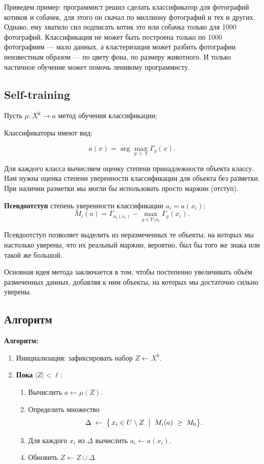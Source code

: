 Приведем пример: программист решил сделать классификатор для фотографий котиков и собачек, для этого он скачал по миллиону фотографий и тех и других. Однако, ему хватило сил подписать котик это или собачка только для 1000 фотографий. Классификация не может быть построена только по 1000 фотографиям --- мало данных, а кластеризация может разбить фотографии неизвестным образом --- по цвету фона, по размеру животного. И только частичное обучение может помочь ленивому программисту.
\subsection{Self-training}


Пусть $\mu: X^{\text{k}} \to a$ \textendash{} метод обучения классификации;

Классификаторы имеют вид:

\[
    a(x) = \arg \max_{y \: \in \: Y}{\Gamma_{y}(x)}.
\]

Для каждого класса вычисляем оценку степени принадлежности объекта классу. Нам нужна оценка степени уверенности классификации для объекта без разметки. При наличии разметки мы могли бы использовать просто маржин (отступ).

\textbf{Псевдоотступ} \textendash{} степень уверенности классификации $a_i = a(x_i):$
\[
    M_i(a) = \Gamma_{a_i(x_i)} - \max_{y \in Y \setminus a_i}{\Gamma_y(x_i)}.
\]

Псевдоотступ позволяет выделить из неразмеченных те объекты, на которых мы настолько уверены, что их реальный маржин, вероятно, был бы того же знака или такой же большой.

Основная идея метода заключается в том, чтобы постепенно увеличивать объём размеченных данных, добавляя к ним объекты, на которых мы достаточно сильно уверены.

\subsection*{Алгоритм}

\noindent
\textbf{Алгоритм:}
\begin{enumerate}
    \item Инициализация: зафиксировать набор $Z \gets X^k$.
    \item \textbf{Пока} $|Z| < \ell$:
          \begin{enumerate}
              \item Вычислить $a \gets \mu(Z)$.
              \item Определить множество
                    \[
                        \Delta \;\gets\; \bigl\{\, x_i \in U \setminus Z \;\bigm|\; M_i(a) \;\ge\; M_0 \bigr\}.
                    \]
              \item Для каждого $x_i$ из $\Delta$ вычислить $a_i \gets a(x_i)$.
              \item Обновить $Z \gets Z \cup \Delta$.
          \end{enumerate}
\end{enumerate}

